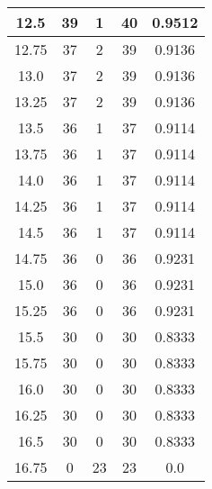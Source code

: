 \documentclass[letterpaper, 12pt]{article}
\begin{document}
\begin{longtable}{|c|c|c|c|c|}
12.5 & 39 & 1 & 40 & 0.9512 \\
\hline
12.75 & 37 & 2 & 39 & 0.9136 \\
\hline
13.0 & 37 & 2 & 39 & 0.9136 \\
\hline
13.25 & 37 & 2 & 39 & 0.9136 \\
\hline
13.5 & 36 & 1 & 37 & 0.9114 \\
\hline
13.75 & 36 & 1 & 37 & 0.9114 \\
\hline
14.0 & 36 & 1 & 37 & 0.9114 \\
\hline
14.25 & 36 & 1 & 37 & 0.9114 \\
\hline
14.5 & 36 & 1 & 37 & 0.9114 \\
\hline
14.75 & 36 & 0 & 36 & 0.9231 \\
\hline
15.0 & 36 & 0 & 36 & 0.9231 \\
\hline
15.25 & 36 & 0 & 36 & 0.9231 \\
\hline
15.5 & 30 & 0 & 30 & 0.8333 \\
\hline
15.75 & 30 & 0 & 30 & 0.8333 \\
\hline
16.0 & 30 & 0 & 30 & 0.8333 \\
\hline
16.25 & 30 & 0 & 30 & 0.8333 \\
\hline
16.5 & 30 & 0 & 30 & 0.8333 \\
\hline
16.75 & 0 & 23 & 23 & 0.0 \\
\hline
\end{longtable}
\end{document}
